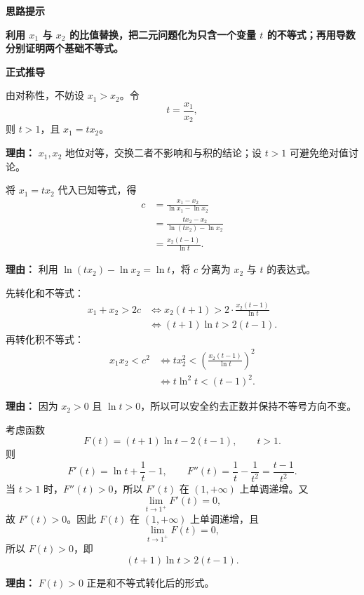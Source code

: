 \begin{proofbox}
	\textbf{\textcolor{CProof}{思路提示}}

	\textbf{利用 $x_1$ 与 $x_2$ 的比值替换，把二元问题化为只含一个变量 $t$ 的不等式；再用导数分别证明两个基础不等式。}

	\medskip
	\textbf{\textcolor{CProof}{正式推导}}
	\begin{description}[style=nextline, leftmargin=2.8em, labelsep=0.5em, itemsep=0.55em]
		\item[\textbf{步骤一（设比值大小）：}]
		      由对称性，不妨设 $x_1>x_2$。令
		      \[
			      t=\frac{x_1}{x_2},
		      \]
		      则 $t>1$，且 $x_1=tx_2$。
		      \par\textbf{理由：} $x_1,x_2$ 地位对等，交换二者不影响和与积的结论；设 $t>1$ 可避免绝对值讨论。

		\item[\textbf{步骤二（表达参数 $c$）：}]
		      将 $x_1=tx_2$ 代入已知等式，得
		      \[
			      \begin{aligned}
				      c
				       & =\frac{x_1-x_2}{\ln x_1-\ln x_2}    \\
				       & =\frac{tx_2-x_2}{\ln(tx_2)-\ln x_2} \\
				       & =\frac{x_2(t-1)}{\ln t}.
			      \end{aligned}
		      \]
		      \par\textbf{理由：} 利用 $\ln(tx_2)-\ln x_2=\ln t$，将 $c$ 分离为 $x_2$ 与 $t$ 的表达式。

		\item[\textbf{步骤三（转化目标不等式）：}]
		      先转化和不等式：
		      \[
			      \begin{aligned}
				      x_1+x_2>2c
				       & \iff x_2(t+1)>2\cdot\frac{x_2(t-1)}{\ln t} \\
				       & \iff (t+1)\ln t>2(t-1).
			      \end{aligned}
		      \]
		      再转化积不等式：
		      \[
			      \begin{aligned}
				      x_1x_2<c^2
				       & \iff tx_2^2<\left(\frac{x_2(t-1)}{\ln t}\right)^2 \\
				       & \iff t\ln^2t<(t-1)^2.
			      \end{aligned}
		      \]
		      \par\textbf{理由：} 因为 $x_2>0$ 且 $\ln t>0$，所以可以安全约去正数并保持不等号方向不变。

		\item[\textbf{步骤四（证明和不等式）：}]
		      考虑函数
		      \[
			      F(t)=(t+1)\ln t-2(t-1),\qquad t>1.
		      \]
		      则
		      \[
			      F'(t)=\ln t+\frac{1}{t}-1,
			      \qquad
			      F''(t)=\frac{1}{t}-\frac{1}{t^2}=\frac{t-1}{t^2}.
		      \]
		      当 $t>1$ 时，$F''(t)>0$，所以 $F'(t)$ 在 $(1,+\infty)$ 上单调递增。又
		      \[
			      \lim_{t\to1^+}F'(t)=0,
		      \]
		      故 $F'(t)>0$。因此 $F(t)$ 在 $(1,+\infty)$ 上单调递增，且
		      \[
			      \lim_{t\to1^+}F(t)=0,
		      \]
		      所以 $F(t)>0$，即
		      \[
			      (t+1)\ln t>2(t-1).
		      \]
		      \par\textbf{理由：} $F(t)>0$ 正是和不等式转化后的形式。


\end{description}
\end{proofbox}
